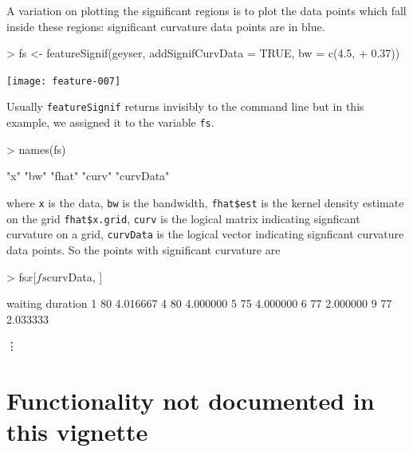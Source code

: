 \documentclass[a4paper,11pt]{article}
\begin{document}
A variation on plotting the significant regions is to plot the data points which
fall inside these regions:
significant curvature data points are in blue.
\begin{center}
\begin{Schunk}
\begin{Sinput}
> fs <- featureSignif(geyser, addSignifCurvData = TRUE, bw = c(4.5, 
+     0.37))
\end{Sinput}
\end{Schunk}
\texttt{[image: feature-007]}
\end{center}

Usually \texttt{featureSignif} returns invisibly to the command line 
but in this example, we assigned it to the variable \texttt{fs}.
\begin{Schunk}
\begin{Sinput}
> names(fs)
\end{Sinput}
\begin{Soutput}
[1] "x"        "bw"       "fhat"     "curv"     "curvData"
\end{Soutput}
\end{Schunk}
where \texttt{x} is the data, \texttt{bw} is the bandwidth, \texttt{fhat\$est} 
is the kernel density estimate
on the grid \texttt{fhat\$x.grid}, 
\texttt{curv} is the logical matrix indicating signficant curvature on a grid,
\texttt{curvData} is the logical vector indicating signficant curvature data points.
So the points with significant curvature are 
\begin{Schunk}
\begin{Sinput}
> fs$x[fs$curvData, ]
\end{Sinput}
\end{Schunk}
\begin{Schunk}
\begin{Soutput}
  waiting duration
1      80 4.016667
4      80 4.000000
5      75 4.000000
6      77 2.000000
9      77 2.033333
\end{Soutput}
\end{Schunk}
\vdots

\section{Functionality not documented in this vignette}
\end{document}
